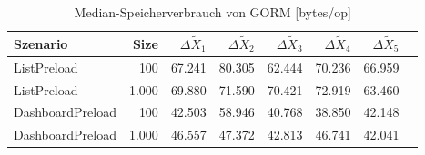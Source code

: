 
\begin{table}[ht]
\setlength{\extrarowheight}{-1pt}
\centering
\caption{Median-Speicherverbrauch von GORM [bytes/op]}
\begin{tabular}{lrrrrrrr}
\toprule
Szenario & Size & ${\Delta \tilde{X}_1}$ & ${\Delta \tilde{X}_2}$ & ${\Delta \tilde{X}_3}$ & ${\Delta \tilde{X}_4}$ & ${\Delta \tilde{X}_5}$ \\
\midrule
	ListPreload & 100 & \cellcolor{red!50}  67.241 & \cellcolor{red!50}  80.305 & \cellcolor{red!50}  62.444 & \cellcolor{red!50}  70.236 & \cellcolor{red!50}  66.959 \\
	ListPreload & 1.000 & \cellcolor{red!50}  69.880 & \cellcolor{red!50}  71.590 & \cellcolor{red!50}  70.421 & \cellcolor{red!50}  72.919 & \cellcolor{red!50}  63.460 \\
	DashboardPreload & 100 & \cellcolor{red!50}  42.503 & \cellcolor{red!50}  58.946 & \cellcolor{red!50}  40.768 & \cellcolor{red!50}  38.850 & \cellcolor{red!50}  42.148 \\
	DashboardPreload & 1.000 & \cellcolor{red!50}  46.557 & \cellcolor{red!50}  47.372 & \cellcolor{red!50}  42.813 & \cellcolor{red!50}  46.741 & \cellcolor{red!50}  42.041 \\
\bottomrule
\end{tabular}
\label{tab:speicherverbrauch_gorm}
\end{table}
	